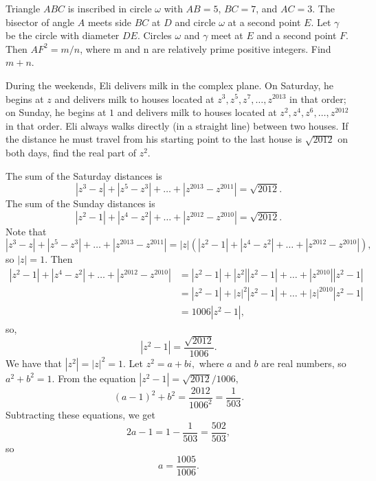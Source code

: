 \documentclass[11pt]{article}
\theoremstyle{definition}
\begin{document}
%	












\begin{question}[name={2012 AIME II, \href{https://artofproblemsolving.com/community/c4p2644107}{Problem 15}}]
	Triangle $ABC$ is inscribed in circle $\omega$ with $AB = 5$, $BC = 7$, and $AC = 3$. The bisector of angle $A$ meets side $BC$ at $D$ and circle $\omega$ at a second point $E$. Let $\gamma$ be the circle with diameter $DE$. Circles $\omega$ and $\gamma$ meet at $E$ and a second point $F$. Then $AF^2 =  m/n$, where m and n are relatively prime positive integers. Find $m + n$.
\end{question}


%	



\begin{question}[name={2012 HMMT, Algebra, \href{https://artofproblemsolving.com/community/c129h521062p2934962}{Problem 4}}]
	During the weekends, Eli delivers milk in the complex plane. On Saturday, he begins at $z$ and delivers milk to houses located at $z^3,z^5,z^7,\ldots,z^{2013}$ in that order; on Sunday, he begins at $1$ and delivers milk to houses located at $z^2,z^4,z^6,\ldots,z^{2012}$ in that order. Eli always walks directly (in a straight line) between two houses. If the distance he must travel from his starting point to the last house is $\sqrt{2012}$ on both days, find the real part of $z^2$.
\end{question}



\begin{solution}[name={Solution by jaymuro}]
	The sum of the Saturday distances is
	\[|z^3 - z| + |z^5 - z^3| + \dots + |z^{2013} - z^{2011}| = \sqrt{2012}.\]The sum of the Sunday distances is
	\[|z^2 - 1| + |z^4 - z^2| + \dots + |z^{2012} - z^{2010}| = \sqrt{2012}.\]Note that
	\[|z^3 - z| + |z^5 - z^3| + \dots + |z^{2013} - z^{2011}| = |z| (|z^2 - 1| + |z^4 - z^2| + \dots + |z^{2012} - z^{2010}|),\]so $|z| = 1.$ Then
	\begin{align*}
		|z^2 - 1| + |z^4 - z^2| + \dots + |z^{2012} - z^{2010}| &= |z^2 - 1| + |z^2| |z^2 - 1| + \dots + |z^{2010}| |z^2 - 1| \\
		&= |z^2 - 1| + |z|^2 |z^2 - 1| + \dots + |z|^{2010} |z^2 - 1| \\
		&= 1006 |z^2 - 1|,
	\end{align*}so,
	\[|z^2 - 1| = \frac{\sqrt{2012}}{1006}.\]We have that $|z^2| = |z|^2 = 1.$ Let $z^2 = a + bi,$ where $a$ and $b$ are real numbers, so $a^2 + b^2 = 1.$ From the equation $|z^2 - 1| = {\sqrt{2012}}/{1006},$
	\[(a - 1)^2 + b^2 = \frac{2012}{1006^2} = \frac{1}{503}.\]Subtracting these equations, we get
	\[2a - 1 = 1 - \frac{1}{503} = \frac{502}{503},\]so $$a = \boxed{\frac{1005}{1006}}.$$
\end{solution}
\end{document}
